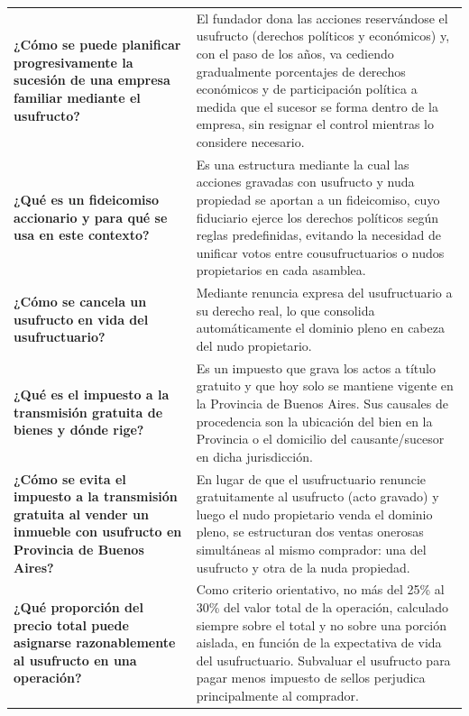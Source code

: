 \documentclass[12pt,oneside]{book}
\begin{document}
\begin{longtable}{
    >{\raggedright\arraybackslash}p{}
    >{\raggedright\arraybackslash}p{}
}
\textbf{¿Cómo se puede planificar progresivamente la sucesión de una empresa familiar mediante el usufructo?} &
El fundador dona las acciones reservándose el usufructo (derechos políticos y económicos) y, con el paso de los años, va cediendo gradualmente porcentajes de derechos económicos y de participación política a medida que el sucesor se forma dentro de la empresa, sin resignar el control mientras lo considere necesario. \\

\textbf{¿Qué es un fideicomiso accionario y para qué se usa en este contexto?} &
Es una estructura mediante la cual las acciones gravadas con usufructo y nuda propiedad se aportan a un fideicomiso, cuyo fiduciario ejerce los derechos políticos según reglas predefinidas, evitando la necesidad de unificar votos entre cousufructuarios o nudos propietarios en cada asamblea. \\

\textbf{¿Cómo se cancela un usufructo en vida del usufructuario?} &
Mediante renuncia expresa del usufructuario a su derecho real, lo que consolida automáticamente el dominio pleno en cabeza del nudo propietario. \\

\textbf{¿Qué es el impuesto a la transmisión gratuita de bienes y dónde rige?} &
Es un impuesto que grava los actos a título gratuito y que hoy solo se mantiene vigente en la Provincia de Buenos Aires. Sus causales de procedencia son la ubicación del bien en la Provincia o el domicilio del causante/sucesor en dicha jurisdicción. \\

\textbf{¿Cómo se evita el impuesto a la transmisión gratuita al vender un inmueble con usufructo en Provincia de Buenos Aires?} &
En lugar de que el usufructuario renuncie gratuitamente al usufructo (acto gravado) y luego el nudo propietario venda el dominio pleno, se estructuran dos ventas onerosas simultáneas al mismo comprador: una del usufructo y otra de la nuda propiedad. \\

\textbf{¿Qué proporción del precio total puede asignarse razonablemente al usufructo en una operación?} &
Como criterio orientativo, no más del 25\% al 30\% del valor total de la operación, calculado siempre sobre el total y no sobre una porción aislada, en función de la expectativa de vida del usufructuario. Subvaluar el usufructo para pagar menos impuesto de sellos perjudica principalmente al comprador. \\


\end{longtable}
\end{document}
